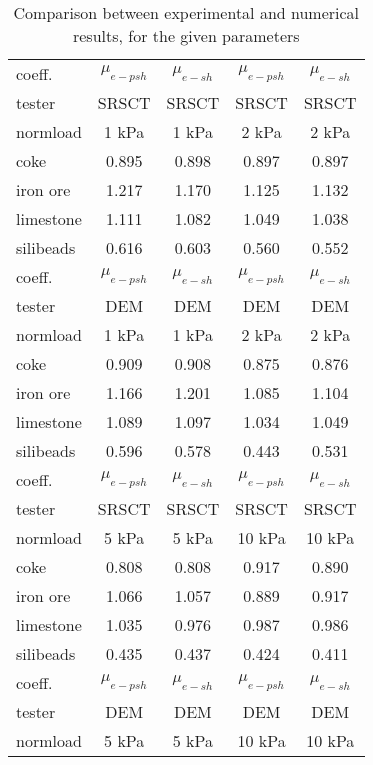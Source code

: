 \begin{table}[!htb]
  \centering
  \caption{Comparison between experimental and numerical results, for the given parameters}
  \begin{tabular}{|lcccc|}
   \hline
    coeff. & $\mu_{e-psh}$ & $\mu_{e-sh}$ & $\mu_{e-psh}$ & $\mu_{e-sh}$ \\
    tester & SRSCT & SRSCT & SRSCT & SRSCT \\
    normload & 1 kPa & 1 kPa & 2 kPa & 2 kPa \\
	\hline
    coke  & 0.895 & 0.898 & 0.897 & 0.897 \\
    iron ore & 1.217 & 1.170 & 1.125 & 1.132 \\
    limestone &  1.111  & 1.082  & 1.049  & 1.038\\
    silibeads & 0.616 & 0.603 & 0.560 & 0.552 \\
 	\hline
	\hline
    coeff. & $\mu_{e-psh}$ & $\mu_{e-sh}$ & $\mu_{e-psh}$ & $\mu_{e-sh}$ \\
    tester & DEM   & DEM   & DEM   & DEM \\
    normload & 1 kPa & 1 kPa & 2 kPa & 2 kPa \\
	\hline
    coke  & 0.909 & 0.908 & 0.875 & 0.876 \\
    iron ore & 1.166 & 1.201 & 1.085 & 1.104 \\
    limestone & 1.089 & 1.097  &  1.034   & 1.049 \\
    silibeads & 0.596 & 0.578 & 0.443 & 0.531 \\
	\hline
	\hline
    coeff. & $\mu_{e-psh}$ & $\mu_{e-sh}$ & $\mu_{e-psh}$ & $\mu_{e-sh}$ \\
    tester & SRSCT & SRSCT & SRSCT & SRSCT \\
    normload & 5 kPa & 5 kPa & 10 kPa & 10 kPa \\
	\hline
    coke  & 0.808 & 0.808 & 0.917 & 0.890 \\
    iron ore & 1.066 & 1.057 & 0.889 & 0.917 \\
    limestone & 1.035 & 0.976 & 0.987 & 0.986 \\
    silibeads & 0.435 & 0.437 & 0.424 & 0.411 \\
	\hline
	\hline
    coeff. & $\mu_{e-psh}$ & $\mu_{e-sh}$ & $\mu_{e-psh}$ & $\mu_{e-sh}$ \\
    tester & DEM   & DEM   & DEM   & DEM \\
    normload & 5 kPa & 5 kPa & 10 kPa & 10 kPa \\

\end{tabular}
\end{table}
